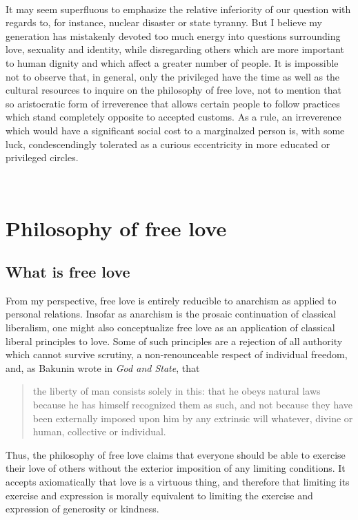 \documentclass[a4paper, 12pt]{article}
\begin{document}
~

It may seem superfluous to emphasize the relative inferiority of
our question with regards to, for instance, nuclear disaster or state tyranny.
But I believe my generation has mistakenly devoted too much energy into
questions surrounding love, sexuality and identity, while disregarding others
which are more important to human dignity and which affect a greater number of
people. It is impossible not to observe that, in general, only the privileged
have the time as well as the cultural resources to inquire on the philosophy of
free love, not to mention that so aristocratic form of irreverence that allows
certain people to follow practices which stand completely opposite to accepted
customs. As a rule, an irreverence which would have a significant social cost
to a marginalzed person is, with some luck, condescendingly tolerated as a curious
eccentricity in more educated or privileged circles.

~ 

\section{Philosophy of free love}

\subsection{What is free love}

From my perspective, free love is entirely reducible to anarchism as applied to
personal relations. Insofar as anarchism is the prosaic continuation of
classical liberalism, one might also conceptualize free love as an application
of classical liberal principles to love. Some of such principles are a
rejection of all authority which cannot survive scrutiny, a non-renounceable
respect of individual freedom, and, as Bakunin wrote in \textit{God and State},
that


\begin{quote}
    the liberty of man consists solely in this: that he obeys natural laws
    because he has himself recognized them as such, and not because they have
    been externally imposed upon him by any extrinsic will whatever, divine or
    human, collective or individual. 
\end{quote}

Thus, the philosophy of free love claims that everyone should be able to
exercise their love of others without the exterior imposition of any limiting
conditions. It accepts axiomatically that love is a virtuous thing, and
therefore that limiting its exercise and expression is morally equivalent to
limiting the exercise and expression of generosity or kindness. 
\end{document}
